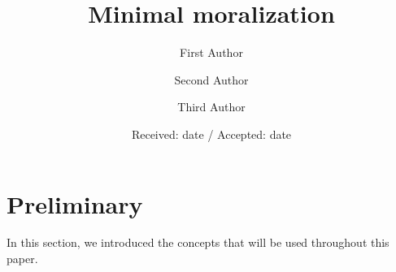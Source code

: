 \newcommand{\COMMENT}[2][.5\linewidth]{\leavevmode\hfill\makebox[#1][l]{//~#2}}
  
\makeatletter
\newcommand*{\centernot}{%
  \mathpalette\@centernot
}
\def\@centernot#1#2{%
  \mathrel{%
    \rlap{%
      \settowidth\dimen@{$\m@th#1{#2}$}%
      \kern.5\dimen@
      \settowidth\dimen@{$\m@th#1=$}%
      \kern-.5\dimen@
      $\m@th#1\not$%
    }%
    {#2}%
  }%
}
\makeatother

%
%



\title{Minimal moralization
}


\author{First Author         \and
        Second Author \and
        Third Author
}



\date{Received: date / Accepted: date}

\maketitle


\section{Preliminary}
In this section, we introduced the concepts that will be used throughout this paper. 

